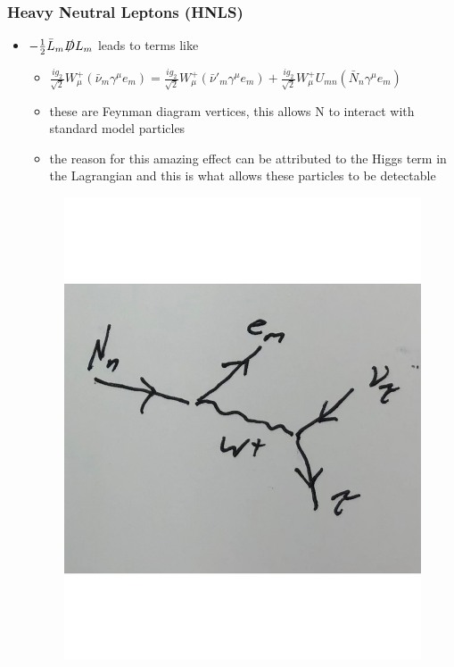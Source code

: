 \documentclass[
	11pt, %
]{beamer}
\begin{document}
\begin{frame}
\frametitle{Heavy Neutral Leptons (HNLS)}
	\begin{itemize}
		\item $- \frac{1}{2} \bar{L}_m \slashed{D} L_m$ leads to terms like 
		\begin{itemize}
			\item $\frac{i g_2}{\sqrt{2}} W_{\mu}^+ ( \bar{\nu}_m \gamma^{\mu} e_m)=\frac{i g_2}{\sqrt{2}} W_{\mu}^+ ( \bar{\nu}'_m \gamma^{\mu} e_m) + \frac{i g_2}{\sqrt{2}} W_{\mu}^+ U_{mn} ( \bar{N}_n \gamma^{\mu} e_m)$
		\end{itemize}
		\begin{itemize}
			\item these are Feynman diagram vertices, this allows N to interact with standard model particles
			\item the reason for this amazing effect can be attributed to the Higgs term in the Lagrangian and this is what allows these particles to be detectable 
		\end{itemize}
\begin{figure}[h!]
	\vspace*{0cm}
	 \hspace*{7cm}
	\includegraphics[scale=.1]{Ndecay.pdf}

\end{figure}
\end{itemize}
\end{frame}
\end{document}
